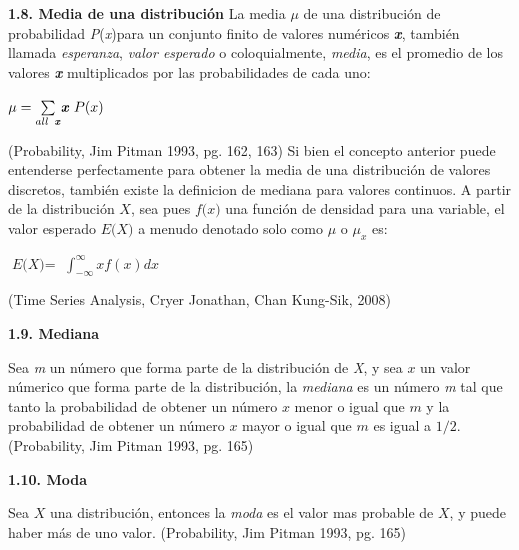{
\noindent
\Large  \textbf{1.8. Media de una distribución} 
}
\newline
La media $\mu$ de una distribución de probabilidad \textit{P}(\textit{x})para un conjunto finito de valores numéricos \textbf{\textit{x}}, también llamada \textit{esperanza}, \textit{valor esperado} o coloquialmente, \textit{media}, es el promedio de los valores \textbf{\textit{x}} multiplicados por las probabilidades de cada uno: 

\begin{center}
$\mu = \underset{all \hspace{0.15cm} \textbf{\textit{x}}}{\overset{}{\sum}} \textbf{\textit{x}} \hspace{0.11cm} P (x) $
\end{center}
(Probability, Jim Pitman 1993, pg. 162, 163)
\newpage
Si bien el concepto anterior puede entenderse perfectamente para obtener la media de una distribución de valores discretos, también existe la definicion de mediana para valores continuos. A partir de la distribución $\textit{X}$, sea pues $\textit{f(x)}$ una función de densidad para una variable, el valor esperado $\textit{E(X)}$ a menudo denotado solo como $\mu$ o $ \mu_x$ es:

\begin{center}
$\textit{E(X)} =$ $\int_{-\infty}^{\infty} x f(x) dx $
\end{center}
(Time Series Analysis, Cryer Jonathan, Chan Kung-Sik, 2008)
\newline

{
\noindent
\Large  \textbf{1.9. Mediana} 
}

Sea \textit{m} un número que forma parte de la distribución de \textit{X}, y sea $\textit{x}$ un valor númerico que forma parte de la distribución, la \textit{mediana} es un número \textit{m} tal que tanto la probabilidad de obtener un número $\textit{x}$ menor o igual que $\textit{m}$ y la probabilidad de obtener un número $\textit{x}$ mayor o igual que $\textit{m}$ es igual a $1/2$. (Probability, Jim Pitman 1993, pg. 165)
\newline

{
\noindent
\Large  \textbf{1.10. Moda} 
}

Sea $\textit{X}$ una distribución, entonces la \textit{moda} es el valor mas probable de $\textit{X}$, y puede haber más de uno valor. (Probability, Jim Pitman 1993, pg. 165)
\newline

